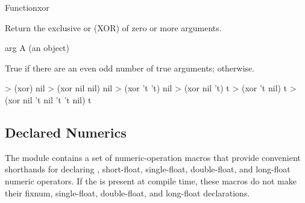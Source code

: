 \documentclass[10pt,twoside,english,pdftex]{article}
\begin{document}

\begin{functiondoc}{Function}{xor}{  
   \returns{} }

\fnsyntax

\fnpurpose Return the exclusive or (XOR) of zero or more arguments.

\fnpackage {}

\fnmodule {}

\fnargs
\begin{args}{arg}
\arg[arg] A  (an object)
\end{args}

\fnreturns True if there are an even odd number of true arguments; \nil{}
otherwise.

\fnexamples
\begin{example}
> (xor)
nil
> (xor nil nil)
nil
> (xor 't 't)
nil
> (xor nil 't)
t
> (xor 't nil)
t
> (xor nil 't nil 't 't nil)
t
\end{example}

\end{functiondoc}


\W\renewcommand{\subsubentities}{1}

\T\markright{}%
\T\pagestyle{plain}
\T\clearpage
\W{}
\T\pagestyle{fancy}
\T\thispagestyle{fancybottom}
\T\global\def\fnlastname{ }%
\subsection{Declared Numerics}
\label{sec:declared-numerics}%
\label{ent:incfAMP}%

%
%
%
%
%
%
%
%
The  module contains a set of
numeric-operation macros that provide convenient shorthands for
declaring , short-float, single-float, double-float, and
long-float numeric operators. If the 
\textbf{} is present at compile time, these
macros do not make their fixnum, single-float, double-float, and long-float
declarations.
\end{document}
